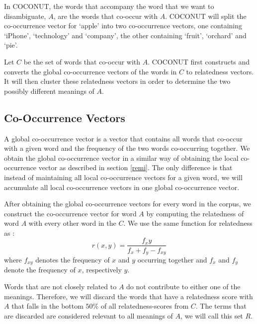 \documentclass[11pt]{article}
\begin{document}
In COCONUT, the words that accompany the word that we want to disambiguate, $A$, are the words that co-occur with $A$. COCONUT will split the co-occurrence vector for `apple' into two co-occurrence vectors, one containing `iPhone', `technology' and `company', the other containing `fruit', `orchard' and `pie'. 

Let $C$ be the set of words that co-occur with $A$. COCONUT first constructs and converts the global co-occurrence vectors of the words in $C$ to relatedness vectors. It will then cluster these relatedness vectors in order to determine the two possibly different meanings of $A$. 

\subsection{Co-Occurrence Vectors}
A global co-occurrence vector is a vector that contains all words that co-occur with a given word and the frequency of the two words co-occurring together. We obtain the global co-occurrence vector in a similar way of obtaining the local co-occurrence vector as described in section \ref{remi}. The only difference is that instead of maintaining all local co-occurrence vectors for a given word, we will accumulate all local co-occurrence vectors in one global co-occurrence vector. 

After obtaining the global co-occurrence vectors for every word in the corpus, we construct the co-occurrence vector for word $A$ by computing the relatedness of word $A$ with every other word in the $C$. We use the same function for relatedness as \cite{Guthrie:92}:
$$r(x, y) = \frac{f_xy}{f_x+f_y - f_{xy}}$$
where $f_{xy}$ denotes the frequency of $x$ and $y$ occurring together and $f_x$ and $f_y$ denote the frequency of $x$, respectively $y$. 

Words that are not closely related to $A$ do not contribute to either one of the meanings. Therefore, we will discard the words that have a relatedness score with $A$ that falls in the bottom $50\%$ of all relatedness-scores from $C$. The terms that are discarded are considered relevant to all meanings of $A$, we will call this set $R$.
\end{document}
